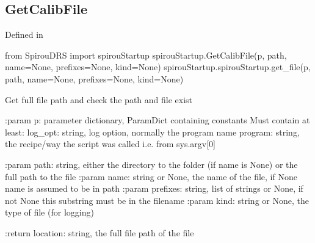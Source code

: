 \noindent\begin{minipage}{\textwidth}
\subsection{GetCalibFile}

Defined in \spirouStartup{}

\begin{pythonbox}
from SpirouDRS import spirouStartup
spirouStartup.GetCalibFile(p, path, name=None, prefixes=None, kind=None)
spirouStartup.spirouStartup.get_file(p, path, name=None, prefixes=None, kind=None)
\end{pythonbox}

\begin{pythondocstring}
  Get full file path and check the path and file exist

  :param p: parameter dictionary, ParamDict containing constants
      Must contain at least:
              log_opt: string, log option, normally the program name
              program: string, the recipe/way the script was called
                       i.e. from sys.argv[0]

  :param path: string, either the directory to the folder (if name is None) or
               the full path to the file
  :param name: string or None, the name of the file, if None name is assumed
               to be in path
  :param prefixes: string, list of strings or None, if not None this
                   substring must be in the filename
  :param kind: string or None, the type of file (for logging)

  :return location: string, the full file path of the file
\end{pythondocstring}
\end{minipage}


